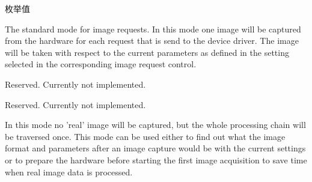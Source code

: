 \begin{Desc}
\item[枚举值]\par
\begin{description}
\item[{\em 
\hypertarget{group___common_interface_gga9e620f0553e3519d83067243240c4518a9b5eb0b82460ccdf4341a17f2357af97}{ircm\+Manual}\label{group___common_interface_gga9e620f0553e3519d83067243240c4518a9b5eb0b82460ccdf4341a17f2357af97}
}]The standard mode for image requests. In this mode one image will be captured from the hardware for each request that is send to the device driver. The image will be taken with respect to the current parameters as defined in the setting selected in the corresponding image request control. \item[{\em 
\hypertarget{group___common_interface_gga9e620f0553e3519d83067243240c4518aa7795ea8dcb6388b58e33dd10a37e5a4}{ircm\+Live}\label{group___common_interface_gga9e620f0553e3519d83067243240c4518aa7795ea8dcb6388b58e33dd10a37e5a4}
}]Reserved. Currently not implemented. \item[{\em 
\hypertarget{group___common_interface_gga9e620f0553e3519d83067243240c4518a0f31a2850d5fae8a76ecd35536bdc747}{ircm\+Counting}\label{group___common_interface_gga9e620f0553e3519d83067243240c4518a0f31a2850d5fae8a76ecd35536bdc747}
}]Reserved. Currently not implemented. \item[{\em 
\hypertarget{group___common_interface_gga9e620f0553e3519d83067243240c4518ad89e80d85a867ab28fcb03b86ecd7371}{ircm\+Trial}\label{group___common_interface_gga9e620f0553e3519d83067243240c4518ad89e80d85a867ab28fcb03b86ecd7371}
}]In this mode no 'real' image will be captured, but the whole processing chain will be traversed once. This mode can be used either to find out what the image format and parameters after an image capture would be with the current settings or to prepare the hardware before starting the first image acquisition to save time when real image data is processed.


\end{description}
\end{Desc}
